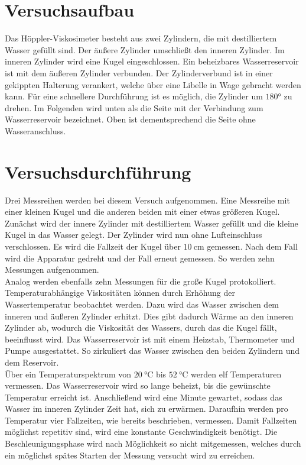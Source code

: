 %

%
\section{Versuchsaufbau}
Das Höppler-Viskosimeter besteht aus zwei Zylindern, die mit destilliertem Wasser gefüllt sind. 
Der äußere Zylinder umschließt den inneren Zylinder. Im inneren Zylinder wird eine Kugel 
eingeschlossen. Ein beheizbares Wasserreservoir ist mit dem äußeren Zylinder verbunden. 
Der Zylinderverbund ist in einer gekippten Halterung verankert, welche über eine Libelle 
in Wage gebracht werden kann. Für eine schnellere Durchführung ist es möglich, die Zylinder um 
$\ang{180;;}$ zu drehen. Im Folgenden wird unten als die Seite mit der Verbindung zum Wasserreservoir 
bezeichnet. Oben ist dementsprechend die Seite ohne Wasseranschluss. 


\section{Versuchsdurchführung}
Drei Messreihen werden bei diesem Versuch aufgenommen. Eine Messreihe mit einer kleinen Kugel 
und die anderen beiden mit einer etwas größeren Kugel. Zunächst wird der innere Zylinder mit  
destilliertem Wasser gefüllt und die kleine Kugel in das Wasser gelegt. Der Zylinder wird nun 
ohne Lufteinschluss verschlossen. Es wird die Fallzeit der Kugel über $\qty{10}{\centi \meter}$
gemessen. Nach dem Fall wird die Apparatur gedreht und der Fall erneut gemessen. So werden zehn 
Messungen aufgenommen.\\
\noindent Analog werden ebenfalls zehn Messungen für die große Kugel protokolliert. \\
\noindent Temperaturabhängige Viskositäten können durch Erhöhung der Wassertemperatur beobachtet werden. 
Dazu wird das Wasser zwischen dem inneren und äußeren Zylinder erhitzt. Dies gibt dadurch Wärme 
an den inneren Zylinder ab, wodurch die Viskosität des Wassers, durch das die Kugel fällt, beeinflusst wird.
Das Wasserreservoir ist mit einem Heizstab, Thermometer und Pumpe ausgestattet. So zirkuliert das Wasser 
zwischen den beiden Zylindern und dem Reservoir.\\
Über ein Temperaturspektrum von $\qty{20}{\celsius}$ bis $\qty{52}{\celsius}$ werden elf Temperaturen vermessen. 
Das Wasserreservoir wird so lange beheizt, bis die gewünschte Temperatur erreicht ist. Anschließend wird eine 
Minute gewartet, sodass das Wasser im inneren Zylinder Zeit hat, sich zu erwärmen. Daraufhin werden pro Temperatur 
vier Fallzeiten, wie bereits beschrieben, vermessen.
Damit Fallzeiten möglichst repetitiv sind, wird eine konstante Geschwindigkeit benötigt. Die Beschleunigungsphase wird 
nach Möglichkeit so nicht mitgemessen, welches durch ein möglichst spätes Starten der Messung versucht wird zu erreichen.

